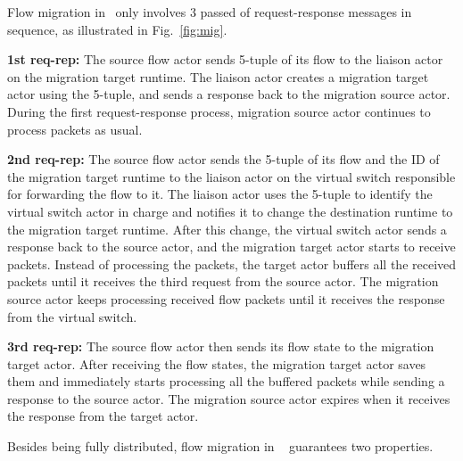 Flow migration in \nfactor~only involves 3 passed of request-response messages in sequence, as illustrated in Fig.~\ref{fig:mig}.



\textbf{1st req-rep:} The source flow actor sends 5-tuple of its flow to the liaison actor on the migration target runtime. The liaison actor creates a migration target actor using the 5-tuple, and sends a response back to the migration source actor. During the first request-response process, migration source actor continues to process packets as usual.

\textbf{2nd req-rep:} The source flow actor sends the 5-tuple of its flow and the ID of the migration target runtime to the liaison actor on the virtual switch responsible for forwarding the flow to it. The liaison actor uses the 5-tuple to identify the virtual switch actor in charge and notifies it to change the destination runtime to the migration target runtime. After this change, the virtual switch actor sends a response back to the source actor, and the migration target actor starts to receive packets. Instead of processing the packets, the target actor buffers all the received packets until it receives the third request from the source actor. The migration source actor keeps processing received flow packets until it receives the response from the virtual switch.

\textbf{3rd req-rep:} The source flow actor then sends its flow state to the migration target actor. After receiving the flow states, the migration target actor saves them and immediately starts processing all the buffered packets while sending a response to the source actor. The migration source actor expires when it receives the response from the target actor.


Besides being fully distributed, flow migration in \nfactor~ guarantees two properties. %

